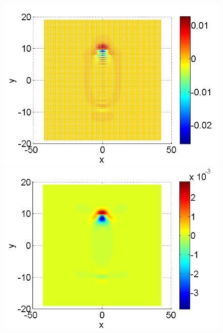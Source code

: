 \documentclass[a4paper]{article}
\theoremstyle{remark}
\begin{document}
\begin{figure}[ht]\vspace{0.4cm}
	\begin{minipage}[b]{0.32\linewidth}
		\includegraphics[width=\linewidth]{SolutionDiff/TaylorZeroBndVsEnergySave_128_ZB2_bt1_c090_h040_O(h^2).png}
	\end{minipage}	
	\begin{minipage}[b]{0.32\linewidth}
		\includegraphics[width=\linewidth]{SolutionDiff/TaylorZeroBndVsEnergySave_128_ZB2_bt1_c090_h020_O(h^2).png}
	\end{minipage}	
	\begin{minipage}[b]{0.32\linewidth}

\end{minipage}
\end{figure}
\end{document}
